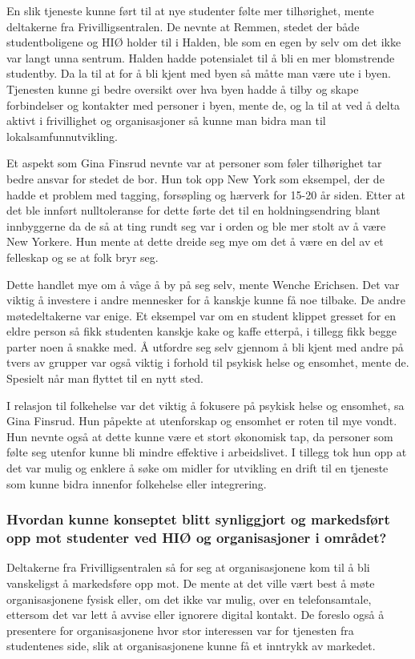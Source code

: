 En slik tjeneste kunne ført til at nye studenter følte mer tilhørighet, mente deltakerne fra Frivilligsentralen. De nevnte at Remmen, stedet der både studentboligene og HIØ holder til i Halden, ble som en egen by selv om det ikke var langt unna sentrum. Halden hadde potensialet til å bli en mer blomstrende studentby. Da la til at for å bli kjent med byen så måtte man være ute i byen. Tjenesten kunne gi bedre oversikt over hva byen hadde å tilby og skape forbindelser og kontakter med personer i byen, mente de, og la til at ved å delta aktivt i frivillighet og organisasjoner så kunne man bidra man til lokalsamfunnutvikling. \cite{FRIVILLIGSENTRALEN-INTERVJU:21}

Et aspekt som Gina Finsrud nevnte var at personer som føler tilhørighet tar bedre ansvar for stedet de bor. Hun tok opp New York som eksempel, der de hadde et problem med tagging, forsøpling og hærverk for 15-20 år siden. Etter at det ble innført nulltoleranse for dette førte det til en holdningsendring blant innbyggerne da de så at ting rundt seg var i orden og ble mer stolt av å være New Yorkere. Hun mente at dette dreide seg mye om det å være en del av et felleskap og se at folk bryr seg. \cite{KOMMUNEN-INTERVJU:20}

Dette handlet mye om å våge å by på seg selv, mente Wenche Erichsen. Det var viktig å investere i andre mennesker for å kanskje kunne få noe tilbake. De andre møtedeltakerne var enige. Et eksempel var om en student klippet gresset for en eldre person så fikk studenten kanskje kake og kaffe etterpå, i tillegg fikk begge parter noen å snakke med. Å utfordre seg selv gjennom å bli kjent med andre på tvers av grupper var også viktig i forhold til psykisk helse og ensomhet, mente de. Spesielt når man flyttet til en nytt sted. \cite{FRIVILLIGSENTRALEN-INTERVJU:21}

I relasjon til folkehelse var det viktig å fokusere på psykisk helse og ensomhet, sa Gina Finsrud. Hun påpekte at utenforskap og ensomhet er roten til mye vondt. Hun nevnte også at dette kunne være et stort økonomisk tap, da personer som følte seg utenfor kunne bli mindre effektive i arbeidslivet.
I tillegg tok hun opp at det var mulig og enklere å søke om midler for utvikling en drift til en tjeneste som kunne bidra innenfor folkehelse eller integrering. \cite{KOMMUNEN-INTERVJU:20}

\setlength{\leftskip}{0pt}

\subsubsection{Hvordan kunne konseptet blitt synliggjort og markedsført opp mot studenter ved HIØ og organisasjoner i området?}
Deltakerne fra Frivilligsentralen så for seg at organisasjonene kom til å bli vanskeligst å markedsføre opp mot. De mente at det ville vært best å møte organisasjonene fysisk eller, om det ikke var mulig, over en telefonsamtale, ettersom det var lett å avvise eller ignorere digital kontakt. De foreslo også å presentere for organisasjonene hvor stor interessen var for tjenesten fra studentenes side, slik at organisasjonene kunne få et inntrykk av markedet. \cite{FRIVILLIGSENTRALEN-INTERVJU:21}

